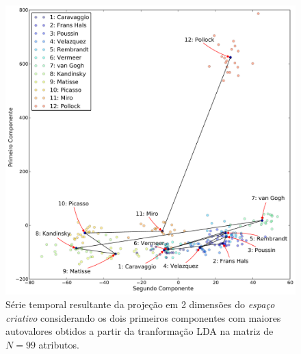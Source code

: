 \begin{figure}[h!]
\begin{center}
        \caption{Série temporal resultante da projeção em 2 dimensões do
        \textit{espaço criativo} considerando os dois primeiros componentes com
        maiores autovalores obtidos a partir da tranformação LDA na matriz de
        $N = 99$ atributos.}
        \label{fig:caso3_g1}
        \includegraphics[width=\columnwidth]{figs/caso3_g1}
        \fonteminha
\end{center}
\end{figure}

